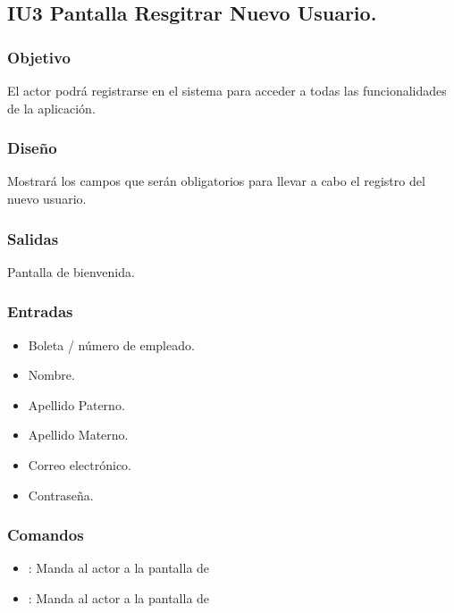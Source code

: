 
\subsection{IU3 Pantalla Resgitrar Nuevo Usuario.}

\subsubsection{Objetivo}
	El actor podrá registrarse en el sistema para acceder a todas las funcionalidades de la aplicación.

\subsubsection{Diseño}
	Mostrará los campos que serán obligatorios para llevar a cabo el registro del nuevo usuario.


\subsubsection{Salidas}

	Pantalla de bienvenida.

\subsubsection{Entradas}

\begin{itemize}
	\item Boleta / número de empleado.
	\item Nombre.
	\item Apellido Paterno.
	\item Apellido Materno.
	\item Correo electrónico.
	\item Contraseña.
\end{itemize}

\subsubsection{Comandos}
\begin{itemize}
	\item {}: Manda al actor a la pantalla de 
	\item {}: Manda al actor a la pantalla de 
\end{itemize}

